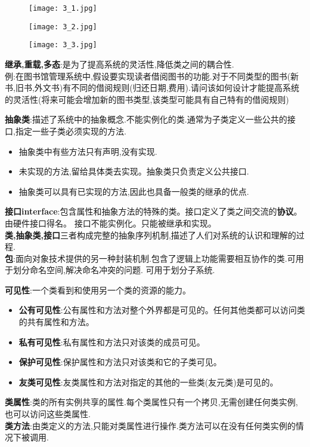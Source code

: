 \documentclass[../main.tex]{subfiles}
\begin{document}
\begin{figure}[H]
  \begin{center}
    \texttt{[image: 3\_1.jpg]}
  \end{center}
\end{figure}
\begin{figure}[H]
  \begin{center}
    \texttt{[image: 3\_2.jpg]}
  \end{center}
\end{figure}
\begin{figure}[H]
  \begin{center}
    \texttt{[image: 3\_3.jpg]}
  \end{center}
\end{figure}

\textbf{继承,重载,多态}:是为了提高系统的灵活性,降低类之间的耦合性.\\
例:在图书馆管理系统中,假设要实现读者借阅图书的功能.对于不同类型的图书(新书,旧书,外文书)有不同的借阅规则(归还日期,费用).请问该如何设计才能提高系统的灵活性(将来可能会增加新的图书类型,该类型可能具有自己特有的借阅规则)

\textbf{抽象类}:描述了系统中的抽象概念.不能实例化的类.通常为子类定义一些公共的接口,指定一些子类必须实现的方法.
\begin{itemize}
  \item 抽象类中有些方法只有声明,没有实现.
  \item 未实现的方法,留给具体类去实现。抽象类只负责定义公共接口.
  \item 抽象类可以具有已实现的方法,因此也具备一般类的继承的优点.
\end{itemize}
\textbf{接口{interface}}:包含属性和抽象方法的特殊的类。接口定义了类之间交流的\textbf{协议}。由硬件接口得名。
接口不能实例化。只能被继承和实现。 \\
\textbf{类,抽象类,接口}三者构成完整的抽象序列机制,描述了人们对系统的认识和理解的过程. \\
\textbf{包}:面向对象技术提供的另一种封装机制.包含了逻辑上功能需要相互协作的类.可用于划分命名空间,解决命名冲突的问题.
可用于划分子系统.

\textbf{可见性}:一个类看到和使用另一个类的资源的能力。
\begin{itemize}
  \item \textbf{公有可见性}:公有属性和方法对整个外界都是可见的。任何其他类都可以访问类的共有属性和方法。
  \item \textbf{私有可见性}:私有属性和方法只对该类的成员可见。
  \item \textbf{保护可见性}:保护属性和方法只对该类和它的子类可见。
  \item \textbf{友类可见性}:友类属性和方法对指定的其他的一些类(友元类)是可见的。
\end{itemize}
\textbf{类属性}:类的所有实例共享的属性.每个类属性只有一个拷贝,无需创建任何类实例,也可以访问这些类属性. \\
\textbf{类方法}:由类定义的方法,只能对类属性进行操作.类方法可以在没有任何类实例的情况下被调用.
\end{document}
